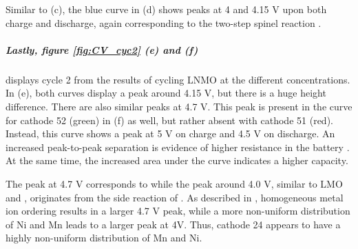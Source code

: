 \documentclass[Main/main.tex]{subfiles}
\begin{document}
Similar to (c), the blue curve in (d) shows peaks at 4 and 4.15 V upon both charge and discharge, again corresponding to the two-step spinel reaction \cite{LNMO}.

\subparagraph{Lastly, figure \ref{fig:CV_cyc2} (e) and (f)} \hspace{-1em} displays cycle 2 from the results of cycling LNMO at the different concentrations. In (e), both curves display a peak around 4.15 V, but there is a huge height difference. There are also similar peaks at 4.7 V. This peak is present in the curve for cathode 52 (green) in (f) as well, but rather absent with cathode 51 (red). Instead, this curve shows a peak at 5 V on charge and 4.5 V on discharge. An increased peak-to-peak separation is evidence of higher resistance in the battery \cite{2_CV}. At the same time, the increased area under the curve indicates a higher capacity.

The peak at 4.7 V corresponds to  while the peak around 4.0 V, similar to LMO and , originates from the side reaction of . As described in \cite{LNMO}, homogeneous metal ion ordering results in a larger 4.7 V peak, while a more non-uniform distribution of Ni and Mn leads to a larger peak at 4V. Thus, cathode 24 appears to have a highly non-uniform distribution of Mn and Ni.
\end{document}
